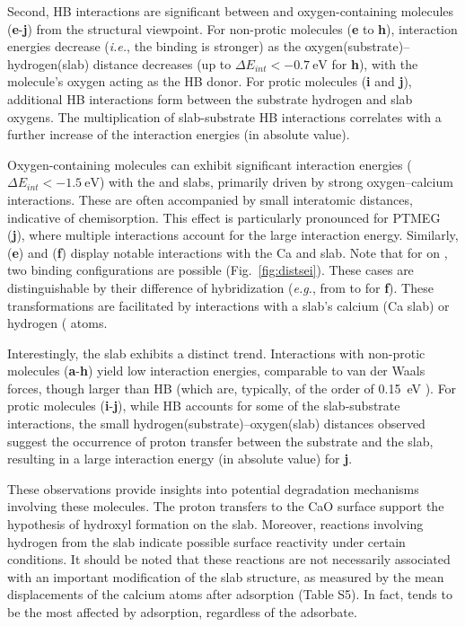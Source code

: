 \documentclass[journal=jpccck,manuscript=article]{achemso}
\begin{document}
Second, HB interactions are significant between  and oxygen-containing mole\-cules (\textbf{e}-\textbf{j}) from the structural viewpoint. For non-protic molecules (\textbf{e} to \textbf{h}), interaction energies decrease (\textit{i.e.}, the binding is stronger) as the oxygen(substrate)--hydrogen(slab) distance decreases (up to $\Delta E_{int}<-\SI{0.7}{\electronvolt}$ for \textbf{h}), with the molecule's oxygen acting as the HB donor. For protic molecules (\textbf{i} and \textbf{j}), additional HB interactions form between the substrate hydrogen and slab oxygens. The multiplication of slab-substrate HB interactions correlates with a further increase of the interaction energies (in absolute value).


Oxygen-containing molecules can exhibit significant interaction energies ($\Delta E_{int} < \SI{-1.5}{\electronvolt}$) with the  and  slabs, primarily driven by strong oxygen--calcium interactions. These are often accompanied by small interatomic distances, indicative of chemisorption. This effect is particularly pronounced for PTMEG (\textbf{j}), where multiple interactions account for the large interaction energy. Similarly,  (\textbf{e}) and  (\textbf{f}) display notable interactions with the Ca and  slab. Note that for  on , two binding configurations are possible (Fig.~\ref{fig:distsei}). These cases are distinguishable by their difference of hybridization (\textit{e.g.}, from  to  for \textbf{f}). These transformations are facilitated by interactions with a slab’s calcium (Ca slab) or hydrogen ( atoms.

Interestingly, the  slab exhibits a distinct trend. Interactions with non-protic molecules (\textbf{a}-\textbf{h}) yield low interaction energies, comparable to van der Waals forces, though larger than HB (which are, typically, of the order of \SI{0.15}{\electronvolt} \cite{boeseDensityFunctionalTheory2015}). For protic molecules (\textbf{i}-\textbf{j}), while HB accounts for some of the slab-substrate interactions, the small hydrogen(substrate)--oxygen(slab) distances observed suggest the occurrence of proton transfer between the substrate and the slab, resulting in a large interaction energy (in absolute value) for \textbf{j}.

These observations provide insights into potential degradation mechanisms involving these molecules. The proton transfers to the CaO surface support the hypothesis of hydroxyl formation on the slab. Moreover, reactions involving hydrogen from the  slab indicate possible surface reactivity under certain conditions.  It should be noted that these reactions are not necessarily associated with an important modification of the slab structure, as measured by the mean displacements of the calcium atoms after adsorption (Table S5). In fact,  tends to be the most affected by adsorption, regardless of the adsorbate.
\end{document}
